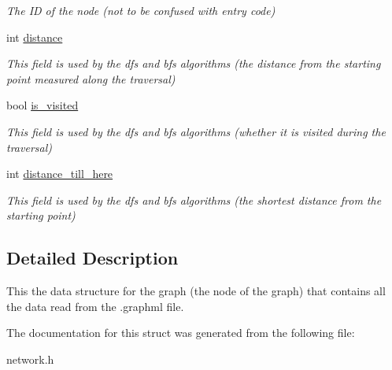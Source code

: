\begin{DoxyCompactItemize}
\begin{DoxyCompactList}\small\item\em \-The \-I\-D of the node (not to be confused with entry code) \end{DoxyCompactList}\item 
\hypertarget{structGraphNode_ab1642652eae4367c76a17cede7762471}{int \hyperlink{structGraphNode_ab1642652eae4367c76a17cede7762471}{distance}}\label{structGraphNode_ab1642652eae4367c76a17cede7762471}

\begin{DoxyCompactList}\small\item\em \-This field is used by the dfs and bfs algorithms (the distance from the starting point measured along the traversal) \end{DoxyCompactList}\item 
\hypertarget{structGraphNode_a2fb577c335546dfd6853fbb877a2e4b4}{bool \hyperlink{structGraphNode_a2fb577c335546dfd6853fbb877a2e4b4}{is\-\_\-visited}}\label{structGraphNode_a2fb577c335546dfd6853fbb877a2e4b4}

\begin{DoxyCompactList}\small\item\em \-This field is used by the dfs and bfs algorithms (whether it is visited during the traversal) \end{DoxyCompactList}\item 
\hypertarget{structGraphNode_a9e9def63171eb82d99bb12c85e464443}{int \hyperlink{structGraphNode_a9e9def63171eb82d99bb12c85e464443}{distance\-\_\-till\-\_\-here}}\label{structGraphNode_a9e9def63171eb82d99bb12c85e464443}

\begin{DoxyCompactList}\small\item\em \-This field is used by the dfs and bfs algorithms (the shortest distance from the starting point) \end{DoxyCompactList}\end{DoxyCompactItemize}


\subsection{\-Detailed \-Description}
\-This the data structure for the graph (the node of the graph) that contains all the data read from the .graphml file. 

\-The documentation for this struct was generated from the following file\-:\begin{DoxyCompactItemize}
\item 
network.\-h\end{DoxyCompactItemize}
